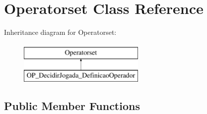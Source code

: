 \hypertarget{classOperatorset}{
\section{Operatorset Class Reference}
\label{classOperatorset}
}
Inheritance diagram for Operatorset:\begin{figure}[H]
\begin{center}
\leavevmode
\includegraphics[height=2.000000cm]{classOperatorset}
\end{center}
\end{figure}
\subsection*{Public Member Functions}
